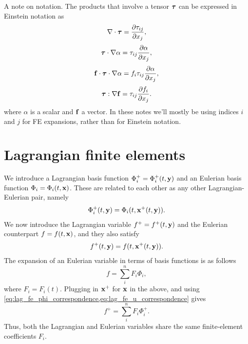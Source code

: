 \documentclass[11pt]{article}
\begin{document}
A note on notation. The products that involve a tensor $\bm \tau$ can be expressed in Einstein notation as
\begin{equation}
    \nabla \cdot \bm \tau = \frac{\partial \tau_{ij}}{\partial x_j},
\end{equation}
\begin{equation}
    \bm \tau \cdot \nabla \alpha = \tau_{ij} \frac{\partial \alpha}{\partial x_j},
\end{equation}
\begin{equation}
    \mathbf{f} \cdot \bm \tau \cdot \nabla \alpha = f_i \tau_{ij} \frac{\partial \alpha}{\partial x_j},
\end{equation}
\begin{equation}
    \bm \tau : \nabla \mathbf{f} = \tau_{ij} \frac{\partial f_i}{\partial x_j}.
\end{equation}
where $\alpha$ is a scalar and $\mathbf{f}$ a vector. In these notes we'll mostly be using indices $i$ and $j$ for FE expansions, rather than for Einstein notation.

\section{Lagrangian finite elements}
\label{sec:lag_fin_elem}
We introduce a Lagrangian basis function $\Phi_i^+ = \Phi_i^+(t,\mathbf{y})$ and an Eulerian basis function $\Phi_i = \Phi_i(t,\mathbf{x})$. These are related to each other as any other Lagrangian-Eulerian pair, namely 
\begin{equation}
    \label{eq:lag_fe_phi_correspondence}
    \Phi_i^+(t,\mathbf{y}) = \Phi_i(t,\mathbf{x}^+(t,\mathbf{y})).
\end{equation}
We now introduce the Lagrangian variable $f^+ = f^+(t,\mathbf{y})$ and the Eulerian counterpart $f = f(t,\mathbf{x})$, and they also satisfy
\begin{equation}
    \label{eq:lag_fe_u_correspondence}
    f^+(t,\mathbf{y}) = f(t,\mathbf{x}^+(t,\mathbf{y})).
\end{equation}
The expansion of an Eulerian variable in terms of basis functions is as follows
\begin{equation}
    \label{eq:lag_fe_expansion_eul}
    f = \sum_i^n F_i \Phi_i,
\end{equation}
where $F_i = F_i(t)$. Plugging in $\mathbf{x}^+$ for $\mathbf{x}$ in the above, and using \cref{eq:lag_fe_phi_correspondence,eq:lag_fe_u_correspondence} gives
\begin{equation}
    \label{eq:fe_lag_expansion_lag}
    f^+ = \sum_i^n F_i \Phi_i^+.
\end{equation}
Thus, both the Lagrangian and Eulerian variables share the same finite-element coefficients $F_i$. 
\end{document}
